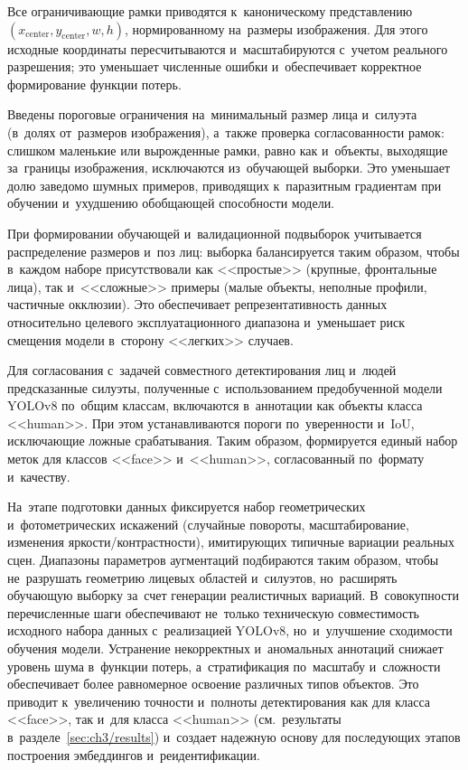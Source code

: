 Все ограничивающие рамки приводятся к~каноническому представлению
$(x_{\text{center}},y_{\text{center}},w,h)$, нормированному
на~размеры изображения. Для этого исходные координаты пересчитываются
и~масштабируются с~учетом реального разрешения; это уменьшает
численные ошибки и~обеспечивает корректное формирование функции
потерь.

Введены пороговые ограничения на~минимальный размер лица и~силуэта
(в~долях от~размеров изображения), а~также проверка согласованности
рамок: слишком маленькие или вырожденные рамки, равно как и~объекты,
выходящие за~границы изображения, исключаются из~обучающей выборки.
Это уменьшает долю заведомо шумных примеров, приводящих к~паразитным
градиентам при обучении и~ухудшению обобщающей способности модели.

При формировании обучающей и~валидационной подвыборок учитывается
распределение размеров и~поз лиц: выборка балансируется таким образом,
чтобы в~каждом наборе присутствовали как <<простые>> (крупные,
фронтальные лица), так и~<<сложные>> примеры (малые объекты, неполные
профили, частичные окклюзии). Это обеспечивает репрезентативность
данных относительно целевого эксплуатационного диапазона и~уменьшает
риск смещения модели в~сторону <<легких>> случаев.

Для согласования с~задачей совместного детектирования лиц и~людей
предсказанные силуэты, полученные с~использованием предобученной
модели YOLOv8 по~общим классам, включаются в~аннотации как объекты
класса <<human>>. При этом устанавливаются пороги по~уверенности
и~IoU, исключающие ложные срабатывания. Таким образом, формируется
единый набор меток для классов <<face>> и~<<human>>, согласованный
по~формату и~качеству.

На~этапе подготовки данных фиксируется набор геометрических
и~фотометрических искажений (случайные повороты, масштабирование,
изменения яркости/контрастности), имитирующих типичные вариации
реальных сцен. Диапазоны параметров аугментаций подбираются таким
образом, чтобы не~разрушать геометрию лицевых областей и~силуэтов,
но~расширять обучающую выборку за~счет генерации реалистичных
вариаций. В~совокупности перечисленные шаги обеспечивают не~только
техническую совместимость исходного набора данных с~реализацией YOLOv8,
но~и~улучшение сходимости обучения модели. Устранение некорректных
и~аномальных аннотаций снижает уровень шума в~функции потерь,
а~стратификация по~масштабу и~сложности обеспечивает более равномерное
освоение различных типов объектов. Это приводит к~увеличению точности
и~полноты детектирования как для класса <<face>>, так и~для класса
<<human>> (см.~результаты в~разделе~\ref{sec:ch3/results}) и~создает
надежную основу для последующих этапов построения эмбеддингов
и~реидентификации.

